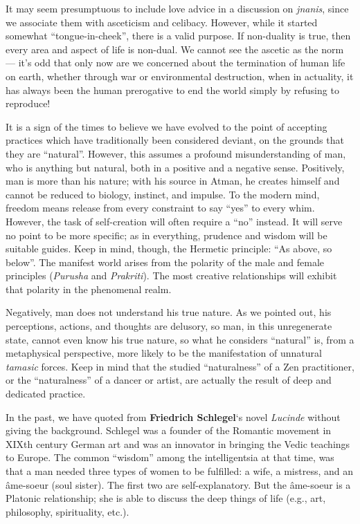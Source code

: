 It may seem presumptuous to include love advice in a discussion on \emph{jnanis}, since we associate them with asceticism and celibacy. However, while it started somewhat “tongue-in-cheek”, there is a valid purpose. If non-duality is true, then every area and aspect of life is non-dual. We cannot see the ascetic as the norm — it's odd that only now are we concerned about the termination of human life on earth, whether through war or environmental destruction, when in actuality, it has always been the human prerogative to end the world simply by refusing to reproduce!

It is a sign of the times to believe we have evolved to the point of accepting practices which have traditionally been considered deviant, on the grounds that they are “natural”. However, this assumes a profound misunderstanding of man, who is anything but natural, both in a positive and a negative sense. Positively, man is more than his nature; with his source in Atman, he creates himself and cannot be reduced to biology, instinct, and impulse. To the modern mind, freedom means release from every constraint to say “yes” to every whim. However, the task of self-creation will often require a “no” instead. It will serve no point to be more specific; as in everything, prudence and wisdom will be suitable guides. Keep in mind, though, the Hermetic principle: “As above, so below”. The manifest world arises from the polarity of the male and female principles (\emph{Purusha} and \emph{Prakriti}). The most creative relationships will exhibit that polarity in the phenomenal realm.

Negatively, man does not understand his true nature. As we pointed out, his perceptions, actions, and thoughts are delusory, so man, in this unregenerate state, cannot even know his true nature, so what he considers “natural” is, from a metaphysical perspective, more likely to be the manifestation of unnatural \emph{tamasic} forces. Keep in mind that the studied “naturalness” of a Zen practitioner, or the “naturalness” of a dancer or artist, are actually the result of deep and dedicated practice.

In the past, we have quoted from \textbf{Friedrich Schlegel}`s novel \emph{Lucinde} without giving the background. Schlegel was a founder of the Romantic movement in XIXth century German art and was an innovator in bringing the Vedic teachings to Europe. The common “wisdom” among the intelligentsia at that time, was that a man needed three types of women to be fulfilled: a wife, a mistress, and an âme-soeur (soul sister). The first two are self-explanatory. But the âme-soeur is a Platonic relationship; she is able to discuss the deep things of life (e.g., art, philosophy, spirituality, etc.).

